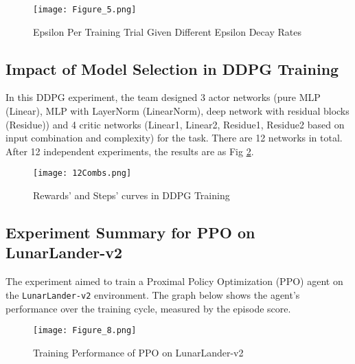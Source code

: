 \documentclass[conference]{IEEEtran}
\begin{document}
\begin{figure}[h]
    \centering
    \texttt{[image: Figure\_5.png]}
    \caption{Epsilon Per Training Trial Given Different Epsilon Decay Rates}
    \label{fig:epsilon_decay_rates}
\end{figure}

\subsection{Impact of Model Selection in DDPG Training}
In this DDPG experiment, the team designed 3 actor networks (pure MLP (Linear), MLP with LayerNorm (LinearNorm), deep network with residual blocks (Residue)) and 4 critic networks (Linear1, Linear2, Residue1, Residue2 based on input combination and complexity) for the task. There are 12 networks in total. After 12 independent experiments, the results are as Fig \ref{fig:12Combs}.
\begin{figure}[!ht]
    \centering
    \texttt{[image: 12Combs.png]}
    \caption{Rewards' and Steps' curves in DDPG Training}
    \label{fig:12Combs}
\end{figure}

\subsection{Experiment Summary for PPO on LunarLander-v2}

The experiment aimed to train a Proximal Policy Optimization (PPO) agent on the \texttt{LunarLander-v2} environment. The graph below shows the agent’s performance over the training cycle, measured by the episode score.

\begin{figure}[h]
    \centering
    \texttt{[image: Figure\_8.png]}
    \caption{Training Performance of PPO on LunarLander-v2}
\end{figure}
\end{document}

